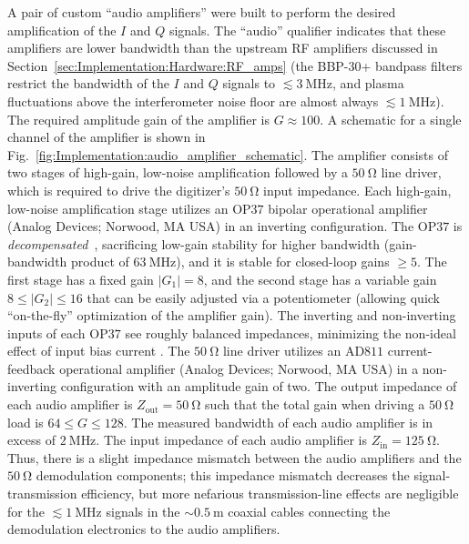 A pair of custom ``audio amplifiers'' were built to
perform the desired amplification of the $I$ and $Q$ signals.
The ``audio'' qualifier indicates that
these amplifiers are lower bandwidth
than the upstream RF amplifiers discussed in
Section~\ref{sec:Implementation:Hardware:RF_amps}
(the {BBP-$30$+} bandpass filters
restrict the bandwidth of the $I$ and $Q$ signals
to $\lesssim \SI{3}{\mega\hertz}$, and
plasma fluctuations above the interferometer noise floor
are almost always $\lesssim \SI{1}{\mega\hertz}$).
The required amplitude gain of the amplifier is $G \approx 100$.
A schematic for a single channel of the amplifier is shown in
Fig.~\ref{fig:Implementation:audio_amplifier_schematic}.
The amplifier consists of two stages
of high-gain, low-noise amplification
followed by a $\SI{50}{\ohm}$ line driver,
which is required to drive the digitizer's $\SI{50}{\ohm}$ input impedance.
Each high-gain, low-noise amplification stage
utilizes an {OP$37$} bipolar operational amplifier
(Analog Devices; Norwood, MA USA)
in an inverting configuration.
The {OP$37$} is \emph{decompensated}~\cite[Sec.~4.9]{horowitz_and_hill},
sacrificing low-gain stability for higher bandwidth
(gain-bandwidth product of $\SI{63}{\mega\hertz}$), and
it is stable for closed-loop gains $\geq 5$.
The first stage has a fixed gain $|G_1| = 8$, and
the second stage has a variable gain $8 \leq |G_2| \leq 16$
that can be easily adjusted via a potentiometer
(allowing quick ``on-the-fly'' optimization of the amplifier gain).
The inverting and non-inverting inputs
of each {OP$37$} see roughly balanced impedances,
minimizing the non-ideal effect of input bias current
\cite[Sec.~4.4.2.E]{horowitz_and_hill}.
The $\SI{50}{\ohm}$ line driver
utilizes an {AD$811$} current-feedback operational amplifier
(Analog Devices; Norwood, MA USA)
in a non-inverting configuration with an amplitude gain of two.
The output impedance of each audio amplifier is
$Z_{\text{out}} = \SI{50}{\ohm}$ such that
the total gain when driving a $\SI{50}{\ohm}$ load
is $64 \leq G \leq 128$.
The measured bandwidth of each audio amplifier
is in excess of $\SI{2}{\mega\hertz}$.
The input impedance of each audio amplifier is
$Z_{\text{in}} = \SI{125}{\ohm}$.
Thus, there is a slight impedance mismatch between
the audio amplifiers and the $\SI{50}{\ohm}$ demodulation components;
this impedance mismatch decreases the signal-transmission efficiency, but
more nefarious transmission-line effects are negligible
for the $\lesssim \SI{1}{\mega\hertz}$ signals
in the $\sim \SI{0.5}{\meter}$ coaxial cables
connecting the demodulation electronics to the audio amplifiers.
